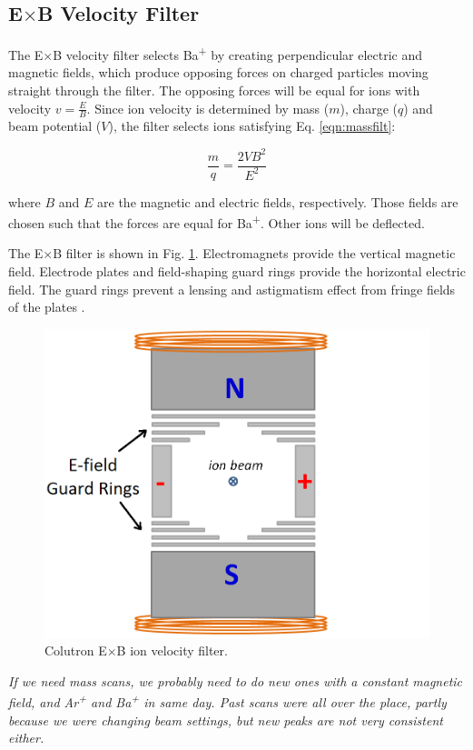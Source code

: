 \subsection{E$\times$B Velocity Filter}

The E$\times$B velocity filter selects Ba\textsuperscript{+} by creating perpendicular electric and magnetic fields, which produce opposing forces on charged particles moving straight through the filter.  The opposing forces will be equal for ions with velocity $v = \frac{E}{B}$.  Since ion velocity is determined by mass ($m$), charge ($q$) and beam potential ($V$), the filter selects ions satisfying Eq. \ref{eqn:massfilt}:

\begin{equation}
\frac{m}{q} = \frac{2 V B^{2}}{E^{2}}
\label{eqn:massfilt}
\end{equation}

\noindent
where $B$ and $E$ are the magnetic and electric fields, respectively.  Those fields are chosen such that the forces are equal for Ba\textsuperscript{+}.  Other ions will be deflected.  

The E$\times$B filter is shown in Fig. \ref{fig:exb}.  Electromagnets provide the vertical magnetic field.  Electrode plates and field-shaping guard rings provide the horizontal electric field.  The guard rings prevent a lensing and astigmatism effect from fringe fields of the plates \cite{Colutron}.

\begin{figure}[h]
        \centering
                \includegraphics[width=.7\textwidth]{figures/ExB.png}
                \caption{Colutron E$\times$B ion velocity filter.}
\label{fig:exb}
\end{figure}

\emph{\color{gray}If we need mass scans, we probably need to do new ones with a constant magnetic field, and Ar\textsuperscript{+} and Ba\textsuperscript{+} in same day.  Past scans were all over the place, partly because we were changing beam settings, but new peaks are not very consistent either.}

